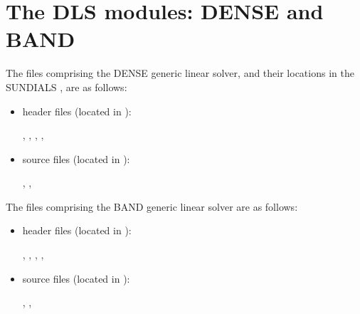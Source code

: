 \documentclass[letterpaper,10pt,english]{sphinxmanual}
\begin{document}
\section{The DLS modules: DENSE and BAND}
\label{linear_solvers/DLS:linearsolvers-dls}\label{linear_solvers/DLS::doc}\label{linear_solvers/DLS:the-dls-modules-dense-and-band}
The files comprising the DENSE generic linear solver, and their
locations in the SUNDIALS , are as follows:
\begin{itemize}
\item {} 
header files (located in ):

, , ,
, 

\item {} 
source files (located in ):

, , 

\end{itemize}

The files comprising the BAND generic linear solver are as follows:
\begin{itemize}
\item {} 
header files (located in ):

, , ,
, 

\item {} 
source files (located in ):

, , 

\end{itemize}
\end{document}
